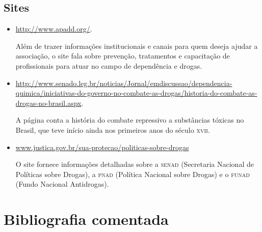 \documentclass[11pt]{extarticle}
\begin{document}
\subsection{Sites}

\begin{itemize}
\item\url{http://www.apadd.org/}.

Além de trazer informações institucionais e canais para quem deseja
ajudar a associação, o site fala sobre prevenção, tratamentos e
capacitação de profissionais para atuar no campo de dependência e
drogas.

\item\url{http://www.senado.leg.br/noticias/Jornal/emdiscussao/dependencia-quimica/iniciativas-do-governo-no-combate-as-drogas/historia-do-combate-as-drogas-no-brasil.aspx}.

A página conta a história do combate repressivo a substâncias tóxicas no
Brasil, que teve início ainda nos primeiros anos do século \textsc{xvii}.

\item\url{www.justica.gov.br/sua-protecao/politicas-sobre-drogas}

O site fornece informações detalhadas sobre a \textsc{senad} (Secretaria Nacional
de Políticas sobre Drogas), a \textsc{pnad} (Política Nacional sobre Drogas) e o
\textsc{funad} (Fundo Nacional Antidrogas).
\end{itemize}

\section{Bibliografia comentada}
\end{document}
